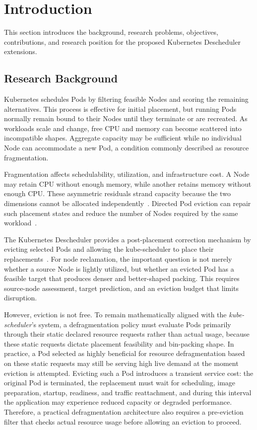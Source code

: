 \section{Introduction}
\label{bab:1}
This section introduces the background, research problems, objectives, contributions, and research position for the proposed Kubernetes Descheduler extensions.

\subsection{Research Background}
\label{sec:researchBackground}

Kubernetes schedules Pods by filtering feasible Nodes and scoring the remaining alternatives. This process is effective for initial placement, but running Pods normally remain bound to their Nodes until they terminate or are recreated. As workloads scale and change, free CPU and memory can become scattered into incompatible shapes. Aggregate capacity may be sufficient while no individual Node can accommodate a new Pod, a condition commonly described as resource fragmentation.

Fragmentation affects schedulability, utilization, and infrastructure cost. A Node may retain CPU without enough memory, while another retains memory without enough CPU. These asymmetric residuals strand capacity because the two dimensions cannot be allocated independently~\cite{xiao2013dynamic,guo2025joint}. Directed Pod eviction can repair such placement states and reduce the number of Nodes required by the same workload~\cite{larsson_klein_elmroth_2023}.

The Kubernetes Descheduler provides a post-placement correction mechanism by evicting selected Pods and allowing the kube-scheduler to place their replacements~\cite{k8s_descheduler_docs}. For node reclamation, the important question is not merely whether a source Node is lightly utilized, but whether an evicted Pod has a feasible target that produces denser and better-shaped packing. This requires source-node assessment, target prediction, and an eviction budget that limits disruption.

However, eviction is not free. To remain mathematically aligned with the \textit{kube-scheduler}'s system, a defragmentation policy must evaluate Pods primarily through their static declared resource requests rather than actual usage, because these static requests dictate placement feasibility and bin-packing shape. In practice, a Pod selected as highly beneficial for resource defragmentation based on these static requests may still be serving high live demand at the moment eviction is attempted. Evicting such a Pod introduces a transient service cost: the original Pod is terminated, the replacement must wait for scheduling, image preparation, startup, readiness, and traffic reattachment, and during this interval the application may experience reduced capacity or degraded performance. Therefore, a practical defragmentation architecture also requires a pre-eviction filter that checks actual resource usage before allowing an eviction to proceed.

